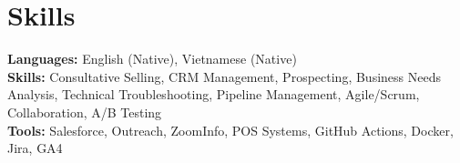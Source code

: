 \documentclass[11pt]{article}
\begin{document}
\vspace{-18.5pt}

\section*{Skills}
\textbf{Languages:} English (Native), Vietnamese (Native)\\
\textbf{Skills:} Consultative Selling, CRM Management, Prospecting, Business Needs Analysis, Technical Troubleshooting, Pipeline Management, Agile/Scrum, Collaboration, A/B Testing\\
\textbf{Tools:} Salesforce, Outreach, ZoomInfo, POS Systems, GitHub Actions, Docker, Jira, GA4

\vspace{-6.5pt}
\end{document}
